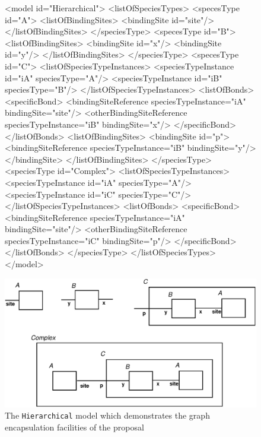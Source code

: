 \documentclass{cekarticle}
\begin{document}
\begin{figure}

\begin{example}
<model id="Hierarchical">
    <listOfSpeciesTypes>
        <specesType id="A">
            <listOfBindingSites>
                <bindingSite id="site"/>
            </listOfBindingSites>
        </speciesType>
        <specesType id="B">
            <listOfBindingSites>
                <bindingSite id="x"/>
                <bindingSite id="y"/>
            </listOfBindingSites>
        </speciesType>
        <specesType id="C">
            <listOfSpeciesTypeInstances>
                <speciesTypeInstance id="iA" speciesType="A"/>
                <speciesTypeInstance id="iB" speciesType="B"/>
            </listOfSpeciesTypeInstances>
            <listOfBonds>
                <specificBond>
                    <bindingSiteReference speciesTypeInstance="iA" bindingSite="site"/>
                    <otherBindingSiteReference speciesTypeInstance="iB" bindingSite="x"/>
                </specificBond>
            </listOfBonds>
            <listOfBindingSites>
                <bindingSite id="p">
                    <bindingSiteReference speciesTypeInstance="iB" bindingSite="y"/>
                </bindingSite>
            </listOfBindingSites>
        </speciesType>
        <speciesType id="Complex">
            <listOfSpeciesTypeInstances>
                <speciesTypeInstance id="iA" speciesType="A"/>
                <speciesTypeInstance id="iC" speciesType="C"/>
            </listOfSpeciesTypeInstances>
            <listOfBonds>
                <specificBond>
                    <bindingSiteReference speciesTypeInstance="iA" bindingSite="site"/>
                    <otherBindingSiteReference speciesTypeInstance="iC" bindingSite="p"/>
                </specificBond>
            </listOfBonds>
        </speciesType>
    </listOfSpeciesTypes>
</model>
\end{example}
  \vspace*{8pt}
  \centering
  \includegraphics[scale = 0.7]{hierarchial.eps}
\caption{The \texttt{Hierarchical} model which demonstrates the graph encapsulation facilities of
the proposal} 
\label{fig:hierarchial}
\end{figure}
\end{document}
